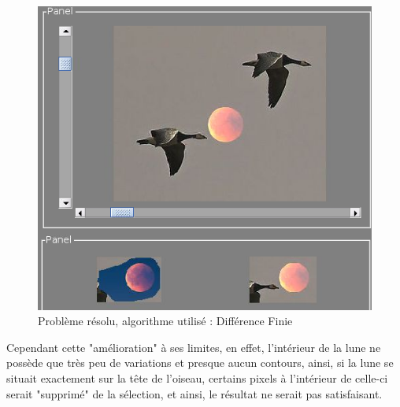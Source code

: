 \begin{figure}[!h]
\centering
\includegraphics[scale=0.25]{Images/sol.png}
\caption{Problème résolu, algorithme utilisé : Différence Finie}
\end{figure}
\newpage
Cependant cette "amélioration" à ses limites, en effet, l'intérieur de la lune ne possède que très peu de variations et presque aucun contours, ainsi, si la lune se situait exactement sur la tête de l'oiseau, certains pixels à l'intérieur de celle-ci serait "supprimé" de la sélection, et ainsi, le résultat ne serait pas satisfaisant.
